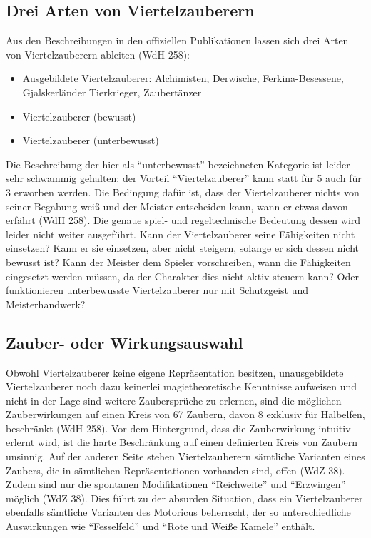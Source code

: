 \subsection{Drei Arten von Viertelzauberern}
Aus den Beschreibungen in den offiziellen Publikationen lassen sich drei Arten von Viertelzauberern ableiten (WdH 258):
\begin{itemize}
	\item Ausgebildete Viertelzauberer: Alchimisten, Derwische, Ferkina-Besessene, Gjalskerländer Tierkrieger, Zaubertänzer
	\item Viertelzauberer (bewusst)
	\item Viertelzauberer (unterbewusst)
\end{itemize}
Die Beschreibung der hier als \enquote{unterbewusst} bezeichneten Kategorie ist leider sehr schwammig gehalten: der Vorteil \enquote{Viertelzauberer} kann statt für \SI{5}{\GP} auch für \SI{3}{\GP} erworben werden. Die Bedingung dafür ist, dass der Viertelzauberer nichts von seiner Begabung weiß und der Meister entscheiden kann, wann er etwas davon erfährt (WdH 258). Die genaue spiel- und regeltechnische Bedeutung dessen wird leider nicht weiter ausgeführt. Kann der Viertelzauberer seine Fähigkeiten nicht einsetzen? Kann er sie einsetzen, aber nicht steigern, solange er sich dessen nicht bewusst ist? Kann der Meister dem Spieler vorschreiben, wann die Fähigkeiten eingesetzt werden müssen, da der Charakter dies nicht aktiv steuern kann? Oder funktionieren unterbewusste Viertelzauberer nur mit Schutzgeist und Meisterhandwerk?

\subsection{Zauber- oder Wirkungsauswahl}
Obwohl Viertelzauberer keine eigene Repräsentation besitzen, unausgebildete Viertelzauberer noch dazu keinerlei magietheoretische Kenntnisse aufweisen und nicht in der Lage sind weitere Zaubersprüche zu erlernen, sind die möglichen Zauberwirkungen auf einen Kreis von 67 Zaubern, davon 8 exklusiv für Halbelfen, beschränkt (WdH 258). Vor dem Hintergrund, dass die Zauberwirkung intuitiv erlernt wird, ist die harte Beschränkung auf einen definierten Kreis von Zaubern unsinnig. Auf der anderen Seite stehen Viertelzauberern sämtliche Varianten eines Zaubers, die in sämtlichen Repräsentationen vorhanden sind, offen (WdZ 38). Zudem sind nur die spontanen Modifikationen \enquote{Reichweite} und \enquote{Erzwingen} möglich (WdZ 38). Dies führt zu der absurden Situation, dass ein Viertelzauberer ebenfalls sämtliche Varianten des Motoricus beherrscht, der so unterschiedliche Auswirkungen wie \enquote{Fesselfeld} und \enquote{Rote und Weiße Kamele} enthält.
